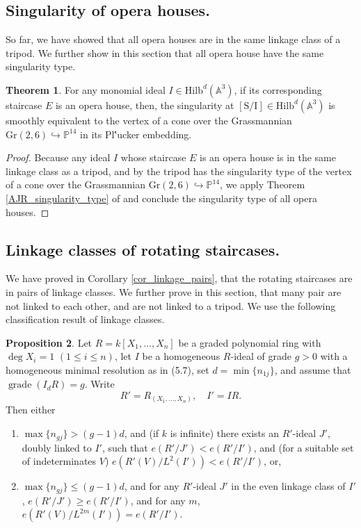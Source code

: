 \documentclass{amsart}[10pt]
\theoremstyle{plain}
\theoremstyle{definition}
\newtheorem{theorem}{Theorem}[section]
\newtheorem{proposition}[theorem]{Proposition}
\newcommand{\Hilb}{\mathrm{Hilb}}
\begin{document}
\subsection{Singularity of opera houses.}

So far, we have showed that all opera houses are in the same linkage class of a tripod. We further show in this section that all opera house have the same singularity type.

\begin{theorem}
For any monomial ideal $I \in \Hilb^d(\mathbb{A}^3)$, if its corresponding staircase $E$ is an opera house, then, the singularity at $[\mathrm{S}/\mathrm{I}] \in \Hilb^d(\mathbb{A}^3)$ is smoothly equivalent to the vertex of a cone over the Grassmannian $\mathrm{Gr}(2,6) \hookrightarrow \mathbb{P}^{14}$ in its Pl\''ucker embedding.
\end{theorem}

\begin{proof}
Because any ideal $I$ whose staircase $E$ is an opera house is in the same linkage class as a tripod, and by \cite{AJR1} \cite{Katz} the tripod has the singularity type of the vertex of a cone over the Grassmannian $\mathrm{Gr}(2,6) \hookrightarrow \mathbb{P}^{14}$, we apply Theorem \ref{AJR_singularity_type} of \cite{AJR1} and conclude the singularity type of all opera houses.
\end{proof}

\subsection{Linkage classes of rotating staircases.}

We have proved in Corollary \ref{cor_linkage_pairs}, that the rotating staircases are in pairs of linkage classes. We further prove in this section, that many pair are not linked to each other, and are not linked to a tripod. We use the following classification result of linkage classes.

\begin{proposition}
\cite{HU}
\label{prop_HU}
Let $R = k[X_1, \dots, X_n]$ be a graded polynomial ring with $\deg X_i = 1$ $(1 \le i \le n)$, let $I$ be a homogeneous $R$-ideal of grade $g > 0$ with a homogeneous minimal resolution as in (5.7), set $d = \min\{n_{1j}\}$, and assume that $\operatorname{grade}(I_d R) = g$. Write
$$R' = R_{(X_1, \dots, X_n)}, \quad I' = IR.$$
Then either
\begin{enumerate}
\item[a)] $\max\{n_{gj}\} > (g - 1)d$, and (if $k$ is infinite) there exists an $R'$-ideal $J'$, doubly linked to $I'$, such that $e(R'/J') < e(R'/I')$, and (for a suitable set of indeterminates $V$) $e(R'(V)/L^2(I')) < e(R'/I')$, or,
    
\item[b)] $\max\{n_{gj}\} \le (g - 1)d$, and for any $R'$-ideal $J'$ in the even linkage class of $I'$, $e(R'/J') \ge e(R'/I')$, and for any $m$, $e(R'(V)/L^{2m}(I')) = e(R'/I')$.
\end{enumerate}
\end{proposition}
\end{document}
